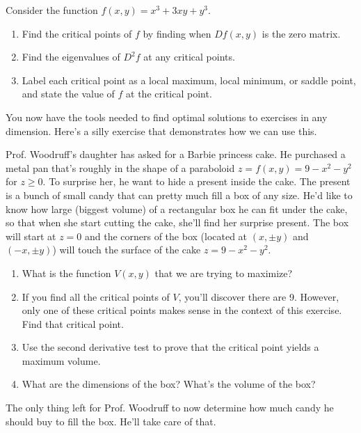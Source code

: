 %


\begin{problem}
Consider the function $f(x,y)=x^3 + 3xy +y^3$.  
\begin{enumerate}
 \item Find the critical points of $f$ by finding when $Df(x,y)$ is the zero matrix.
 \item Find the eigenvalues of $D^2f$ at any critical points.
 \item Label each critical point as a local maximum, local minimum, or saddle point, and state the value of $f$ at the critical point.
\end{enumerate}
\end{problem}

You now have the tools needed to find optimal solutions to exercises in any dimension. Here's a silly exercise that demonstrates how we can use this.

\begin{problem}\label{optimize box in cake}
Prof. Woodruff's daughter has asked for a Barbie princess cake. He purchased a metal pan that's roughly in the shape of a paraboloid $z=f(x,y)=9-x^2-y^2$ for $z\geq 0$. To surprise her, he want to hide a present inside the cake. The present is a bunch of small candy that can pretty much fill a box of any size.  He'd like to know how large (biggest volume) of a rectangular box he can fit under the cake, so that when she start cutting the cake, she'll find her surprise present. The box will start at $z=0$ and the corners of the box (located at $(x,\pm y)$ and $(-x,\pm y)$) will touch the surface of the cake $z=9-x^2-y^2$.  
\begin{enumerate}
 \item What is the function $V(x,y)$ that we are trying to maximize?
 \item If you find all the critical points of $V$, you'll discover there are 9.  However, only one of these critical points makes sense in the context of this exercise. Find that critical point.
 \item Use the second derivative test to prove that the critical point yields a maximum volume.
 \item What are the dimensions of the box? What's the volume of the box?
\end{enumerate}
 The only thing left for Prof. Woodruff to now determine how much candy he should buy to fill the box. He'll take care of that.
\end{problem}
 
